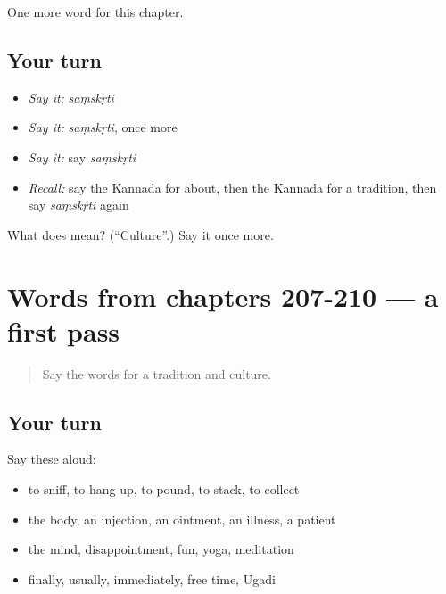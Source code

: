 \begin{grammarlens}[title={What you've built}]
One more word for this chapter.
\end{grammarlens}

\subsection*{Your turn}
\begin{itemize}
\raggedright
  \item \emph{Say it:} \emph{saṃskṛti}
  \item \emph{Say it:} \emph{saṃskṛti}, once more
  \item \emph{Say it:} say \emph{saṃskṛti}
  \item \emph{Recall:} say the Kannada for about, then the Kannada for a tradition, then say \emph{saṃskṛti} again
\end{itemize}

\begin{tcolorbox}[breakable,colback=teal!4,colframe=teal!35!black,title={Before you move on}]
What does  mean? (\textquotedblleft{}Culture\textquotedblright{}.) Say it once more.
\end{tcolorbox}
\section[(dialogue)]{Words from chapters 207-210 — a first pass}

\label{lesson:KA-R215-first-pass-words-from-chapters-207-210}



\begin{quote}
Say the words for a tradition and culture.
\end{quote}

\subsection*{Your turn}
Say these aloud:

\begin{itemize}
\raggedright
  \item to sniff, to hang up, to pound, to stack, to collect
  \item the body, an injection, an ointment, an illness, a patient
  \item the mind, disappointment, fun, yoga, meditation
  \item finally, usually, immediately, free time, Ugadi
\end{itemize}

